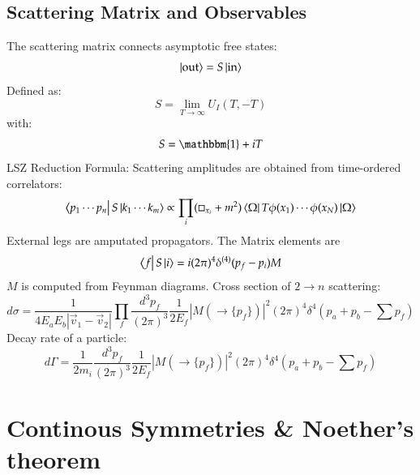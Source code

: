 \documentclass{article}
\begin{document}
\subsection{Scattering Matrix and Observables}
The scattering matrix connects asymptotic free states:
\begin{equation*}
    \ket{\text{out}} = S \ket{\text{in}}
\end{equation*}
Defined as:
\begin{equation*}
    S = \lim_{T\to\infty} U_I(T,-T)
\end{equation*}
with:
\begin{equation*}
    S = \mathbbm{1} + iT
\end{equation*}
LSZ Reduction Formula: Scattering amplitudes are obtained from time-ordered correlators:
\begin{equation*}
    \bra{p_1\cdots p_n} S \ket{k_1\cdots k_m}
    \propto
    \prod_i (\Box_{x_i}+m^2)
    \bra{\Omega} T\phi(x_1)\cdots\phi(x_N) \ket{\Omega}
\end{equation*}
External legs are amputated propagators.
\newline
The Matrix elements are
\begin{equation*}
    \bra{f} S \ket{i} = i(2\pi)^4\delta^{(4)}(p_f-p_i)M
\end{equation*}
$M$ is computed from Feynman diagrams.
\newline
Cross section of $2\rightarrow n$ scattering:
\begin{equation*}
    d\sigma = \frac{1}{4E_aE_b|\vec{v}_1-\vec{v}_2|}
    \prod_f \frac{d^3p_f}{(2\pi)^3}\frac{1}{2E_f}\left|M(\rightarrow \{p_f\})\right|^2(2\pi)^4\delta^4\left(p_a + p_b - \sum p_f\right)
\end{equation*}
Decay rate of a particle:
\begin{equation*}
    d\Gamma = \frac{1}{2m_i}\frac{d^3p_f}{(2\pi)^3}\frac{1}{2E_f}\left|M(\rightarrow\{p_f\})\right|^2(2\pi)^4\delta^4\left(p_a + p_b - \sum p_f\right)
\end{equation*}

\section{Continous Symmetries \& Noether's theorem}
\end{document}
